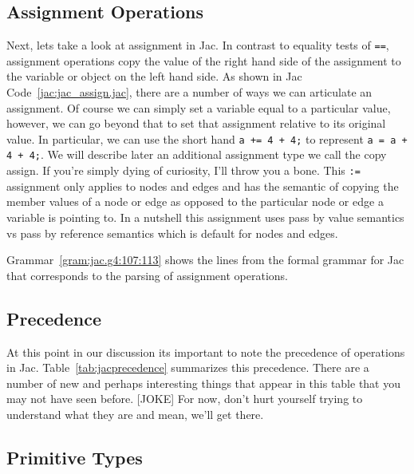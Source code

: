 \subsection{Assignment Operations}
Next, lets take a look at assignment in Jac. In contrast to equality tests of \lstinline{==}, assignment operations copy the value of the right hand side of the assignment to the variable or object on the left hand side.
As shown in Jac Code~\ref{jac:jac_assign.jac}, there are a number of ways we can articulate an assignment. Of course we can simply set a variable equal to a particular value, however, we can go beyond that to set that assignment relative to its original value. In particular, we can use the short hand \lstinline{a += 4 + 4;} to represent \lstinline{a = a + 4 + 4;}. We will describe later an additional assignment type we call the copy assign. If you're simply dying of curiosity, I'll throw you a bone. This \lstinline{:=} assignment only applies to nodes and edges and has the semantic of copying the member values of a node or edge as opposed to the particular node or edge a variable is pointing to. In a nutshell this assignment uses pass by value semantics vs pass by reference semantics which is default for nodes and edges.

\begin{nerd}
    Grammar~\ref{gram:jac.g4:107:113} shows the lines from the formal grammar for Jac that corresponds to the parsing of assignment operations.
\end{nerd}



\subsection{Precedence}
\printtabPrecedence
At this point in our discussion its important to note the precedence of operations in Jac. Table~\ref{tab:jacprecedence} summarizes this precedence. There are a number of new and perhaps interesting things that appear in this table that you may not have seen before. [JOKE] For now, don't hurt yourself trying to understand what they are and mean, we'll get there.

\subsection{Primitive Types}

